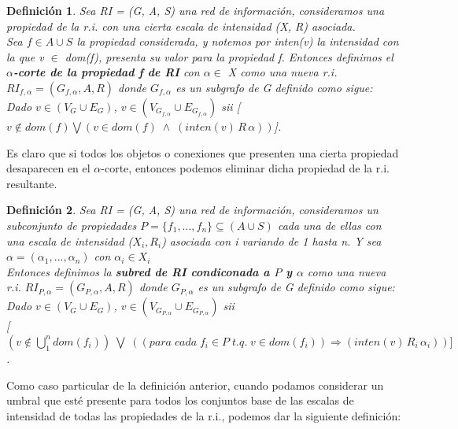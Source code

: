 \documentclass[10pt,a4paper]{article}
\newtheorem{definicion}{Definición}
\begin{document}
\begin{definicion}
\label{defialfacorteprop}
Sea RI = (G, A, S) una red de información, consideramos una propiedad de la r.i. con una cierta escala de intensidad (X, R) asociada.\\

Sea $f \in A \cup S$  la propiedad considerada, y notemos por inten(v) la intensidad con la que v $\in$ dom(f), presenta su valor para la propiedad f. Entonces definimos el \textit{\textbf{$\alpha$-corte de la propiedad f de RI}} con $\alpha \in$ X como una nueva r.i. $RI_{f,\alpha} = (G_{f,\alpha}, A, R)$ donde $G_{f,\alpha}$ es un subgrafo de G definido como sigue:\\

Dado $v \in (V_{G} \cup E_{G})$, $v \in (V_{G_{f,\alpha}} \cup E_{G_{f,\alpha}})$ sii [$v \notin dom(f) \bigvee (v \in dom(f) \; \wedge \; (inten(v) \, R \, \alpha))$].
\end{definicion}

Es claro que si todos los objetos o conexiones que presenten una cierta propiedad desaparecen en el $\alpha$-corte, entonces podemos eliminar dicha propiedad de la r.i. resultante.

\begin{definicion}
\label{defisubredcondicionada}
Sea RI = (G, A, S) una red de información, consideramos un subconjunto de propiedades $P =\{f_{1},...,f_{n}\} \subseteq (A \cup S)$ cada una de ellas con una escala de intensidad ($X_{i},R_{i}$) asociada con i variando de 1 hasta n. Y sea $\alpha = (\alpha_{1},...,\alpha_{n})$ con $\alpha_{i} \in X_{i}$\\

Entonces definimos la \textit{\textbf{subred de RI condiconada a $P$ y $\alpha$}} como una nueva r.i. $RI_{P,\alpha} = (G_{P,\alpha}, A, R)$ donde $G_{P,\alpha}$ es un subgrafo de G definido como sigue:\\

Dado $v \in (V_{G} \cup E_{G})$, $v \in (V_{G_{P,\alpha}} \cup E_{G_{P,\alpha}})$ sii\\

[$(v \notin \bigcup\limits_{1}^{n}dom(f_{i})) \; \bigvee \; ((para \; cada \; f_{i} \in P \; t.q. \; v \in dom(f_{i})) \Rightarrow (inten(v) \, R_{i} \, \alpha_{i}))]$.
\end{definicion}

Como caso particular de la definición anterior, cuando podamos considerar un umbral que esté presente para todos los conjuntos base de las escalas de intensidad de todas las propiedades de la r.i., podemos dar la siguiente definición:
\end{document}
